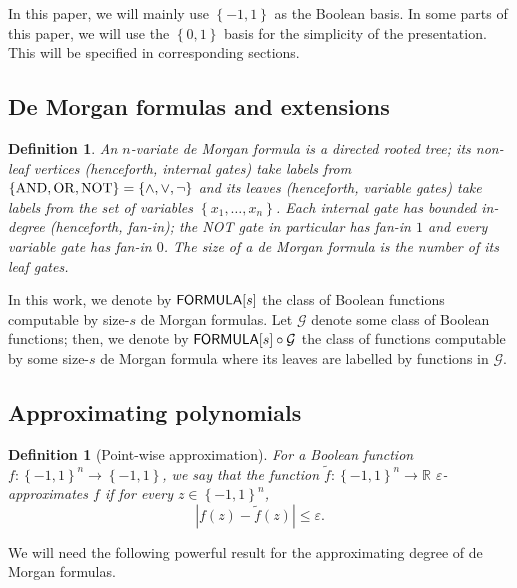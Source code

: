 \documentclass[10pt,a4paper]{article}
\newtheorem{definition}[theorem]{Definition}
\newcommand{\bool}{\left\{0,1\right\}}
\newcommand{\boolpm}{\left\{-1,1\right\}}
\newcommand{\FORMULA}{{\sf FORMULA}}
\newcommand{\real}{\mathbb{R}}
\newcommand{\brkts}[1]{\left\{#1\right\}}
\begin{document}
	In this paper, we will mainly use $\boolpm$ as the Boolean basis. In some parts of this paper, we will use the $\bool$ basis for the simplicity of the presentation. This will be specified in corresponding sections.
	
	\subsection{De Morgan formulas and extensions}
	
	\begin{definition}
	    An $n$-variate \emph{de Morgan formula} is a directed rooted tree; its non-leaf vertices (henceforth, \emph{internal gates}) take labels from $\brkts{{\rm AND},{\rm OR},{\rm NOT}}=\brkts{\land,\lor,\neg}$ and its leaves (henceforth, \emph{variable gates}) take labels from the set of variables $\brkts{x_1,\dots,x_n}$. Each internal gate has bounded in-degree (henceforth, \emph{fan-in}); the {\rm NOT} gate in particular has fan-in $1$ and every variable gate has fan-in $0$. The \emph{size} of a de Morgan formula is the number of its leaf gates.
%
	\end{definition}
	
	In this work, we denote by $\FORMULA[s]$ the class of Boolean functions computable by size-$s$ de Morgan formulas. Let $\mathcal{G}$ denote some class of Boolean functions; then, we denote by $\FORMULA[s]\circ\mathcal{G}$ the class of functions computable by some size-$s$ de Morgan formula where its leaves are labelled by functions in $\mathcal{G}$.
	
%
	
%
%
%
%
%
%
%
%
%
    
%
%
%
%
%
    
    \subsection{Approximating polynomials}
    
    \begin{definition}[Point-wise approximation]
        For a Boolean function $f\colon\boolpm^n\to\boolpm$, we say that the function $\tilde{f}\colon\boolpm^n\to\real$ $\varepsilon$-approximates $f$ if for every $z\in\boolpm^n$,
		\[
			\left| f(z)-\tilde{f}(z)\right| \leq \varepsilon.
		\]
    \end{definition}
    
    We will need the following powerful result for the approximating degree of de Morgan formulas.
    
\end{document}
